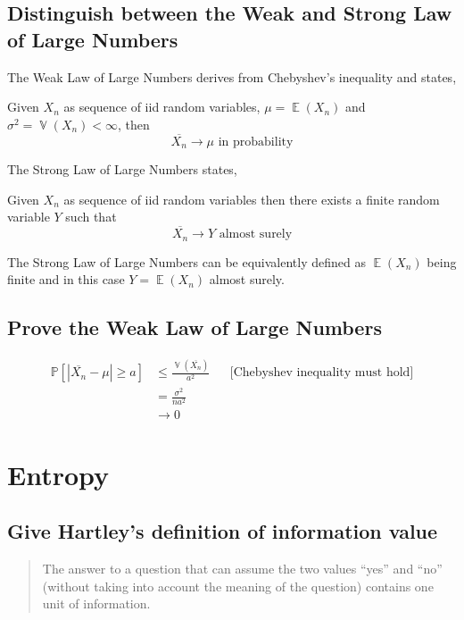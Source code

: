 \documentclass[a4paper]{article}
\newcommand\os[2][P]{\mathbb{#1}\left[#2\right]}
\newcommand\card[1]{\left|#1\right|}
\newcommand\converges{\rightarrow}
\DeclareMathOperator{\Ex}{\mathbb{E}}
\DeclareMathOperator{\Va}{\mathbb{V}}
\theoremstyle{definition}
\begin{document}
\subsection{Distinguish between the Weak and Strong Law of Large Numbers}

The Weak Law of Large Numbers derives from Chebyshev's inequality and states,

\begin{mdframed}
  Given $X_n$ as sequence of iid random variables, $\mu = \Ex(X_n)$ and $\sigma^2 = \Va(X_n) < \infty$, then
  \[ \overline{X_n} \converges \mu \text{ in probability} \]
\end{mdframed}

The Strong Law of Large Numbers states,

\begin{mdframed}
  Given $X_n$ as sequence of iid random variables then there exists a finite random variable $Y$ such that
  \[ \overline{X_n} \converges Y \text{ almost surely} \]
\end{mdframed}

The Strong Law of Large Numbers can be equivalently defined as $\Ex(X_n)$ being finite and in this case $Y = \Ex(X_n)$ almost surely.

\subsection{Prove the Weak Law of Large Numbers}

\begin{align*}
  \os{\card{\overline{X_n} - \mu} \geq a} &\leq \frac{\Va(\overline{X_n})}{a^2}  && \text{[Chebyshev inequality must hold]} \\
    &= \frac{\sigma^2}{na^2} \\
    &\converges 0
\end{align*}

\section{Entropy}

\subsection{Give Hartley's definition of information value}
%
\begin{quote}
  The answer to a question that can assume the two values \enquote{yes} and \enquote{no} (without taking into account the meaning of the question) contains one unit of information.
\end{quote}
\end{document}
